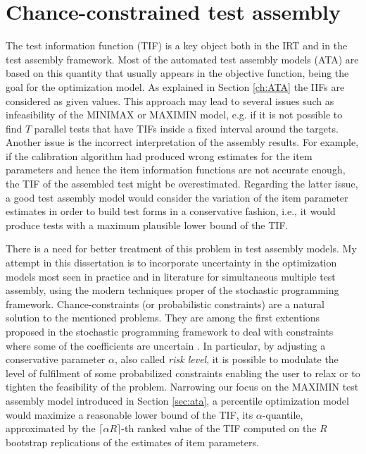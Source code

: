 
\chapter{Chance-constrained test assembly}
\label{ch:CC}

The test information function (TIF) is a key object both in the IRT and in the test assembly framework. Most of the automated test assembly models (ATA) are based on this quantity that usually appears in the objective function, being the goal for the optimization model. As explained in Section \ref{ch:ATA} the IIFs are considered as given values. This approach may lead to several issues such as infeasibility of the MINIMAX or MAXIMIN model, e.g. if it is not possible to find $T$ parallel tests that have TIFs inside a fixed interval around the targets. Another issue is the incorrect interpretation of the assembly results. For example, if the calibration algorithm had produced wrong estimates for the item parameters and hence the item information functions are not accurate enough, the TIF of the assembled test might be overestimated. Regarding the latter issue, a good test assembly model would consider the variation of the item parameter estimates in order to build test forms in a conservative fashion, i.e., it would produce tests with a maximum plausible lower bound of the TIF.  

There is a need for better treatment of this problem in test assembly models. My attempt in this dissertation is to incorporate uncertainty in the optimization models most seen in practice and in literature for simultaneous multiple test assembly, using the modern techniques proper of the stochastic programming framework. Chance-constraints (or probabilistic constraints) are a natural solution to the mentioned problems. They are among the first extentions proposed in the stochastic programming framework to deal with constraints where some of the coefficients are uncertain \parencite{charnes1963deterministic,krokhmal2002portfolio}. In particular, by adjusting a conservative parameter $\alpha$, also called \emph{risk level}, it is possible to modulate the level of fulfilment of some probabilized constraints enabling the user to relax or to tighten the feasibility of the problem. Narrowing our focus on the MAXIMIN test assembly model introduced in Section \ref{sec:ata}, a percentile optimization model would maximize a reasonable lower bound of the TIF, its $\alpha$-quantile, approximated by the $\lceil \alpha R \rceil$-th ranked value of the TIF computed on the $R$ bootstrap replications of the estimates of item parameters.


